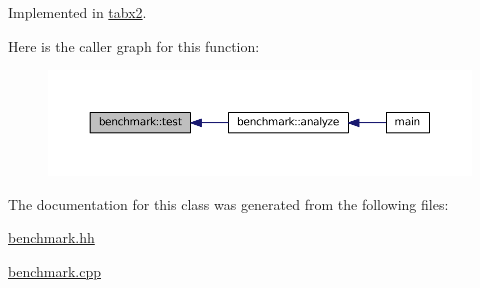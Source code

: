 Implemented in \hyperlink{classtabx2_a41eea5dffaea0a866db5c574129c0ee4}{tabx2}.



Here is the caller graph for this function\+:\nopagebreak
\begin{figure}[H]
\begin{center}
\leavevmode
\includegraphics[width=350pt]{d3/d80/classbenchmark_a698d333f815e6e12c0817b1dfee56e99_icgraph}
\end{center}
\end{figure}




The documentation for this class was generated from the following files\+:\begin{DoxyCompactItemize}
\item 
\hyperlink{benchmark_8hh}{benchmark.\+hh}\item 
\hyperlink{benchmark_8cpp}{benchmark.\+cpp}\end{DoxyCompactItemize}
